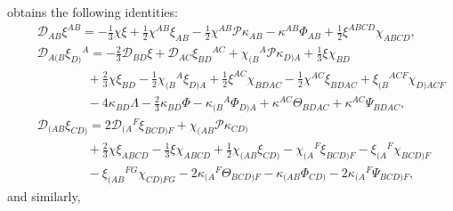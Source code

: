 \documentclass[10pt,a4paper]{article}
\theoremstyle{plain}
\begin{document}
obtains the following identities:
\begin{subequations}
\begin{eqnarray}
&& \mathcal{D}_{AB}\xi^{AB} = -\tfrac{1}{3}\chi\xi+\tfrac{1}{2}
  \chi^{AB} \xi_{AB} -\tfrac{1}{2}\chi^{AB}\mathcal{P} \kappa_{AB}-
  \kappa^{AB} \Phi_{AB} + \tfrac{1}{2} \xi^{ABCD}
  \chi_{ABCD}, \label{SenDivergenceOfSpaceSpinorAuxiliaryVector}\\ &&
  \mathcal{D}_{A(B}\xi_{D)}{}^A =- \tfrac{2}{3}
  \mathcal{D}_{BD}\xi+\mathcal{D}_{AC}\xi_{BD}{}^{AC}+\chi_{(B}{}^A\mathcal{P}\kappa_{D)A}
  + \tfrac{1}{3} \xi \chi_{BD} \nonumber\\ && \qquad \qquad+
  \tfrac{2}{3} \chi \xi_{BD}- \tfrac{1}{2} \chi_{(B}{}^{A}\xi_{D)A}+
  \tfrac{1}{2} \xi^{AC} \chi_{BDAC} - \tfrac{1}{2} \chi^{AC}
  \xi_{BDAC} +\xi_{(B}{}^{ACF}\chi_{D)ACF}\nonumber\\ && \qquad \qquad
  -4 \kappa_{BD} \Lambda - \tfrac{2}{3} \kappa_{BD} \Phi -
  \kappa_{(B}{}^{A}\Phi_{D)A}+ \kappa^{AC} \Theta_{BDAC} + \kappa^{AC}
  \Psi_{BDAC}, \label{SenCurlOfSpaceSpinorAuxiliaryVector}\\ &&
  \mathcal{D}_{(AB}\xi_{CD)}= 2
  \mathcal{D}_{(A}{}^{F}\xi_{BCD)F}+\chi_{(AB}\mathcal{P}\kappa_{CD)}
  \nonumber\\ && \qquad \qquad+\tfrac{2}{3} \chi \xi_{ABCD} -
  \tfrac{1}{3} \xi \chi_{ABCD} + \tfrac{1}{2} \chi_{(AB}\xi_{CD)} -
  \chi_{(A}{}^{F}\xi_{BCD)F} - \xi_{(A}{}^{F}\chi_{BCD)F}
  \nonumber\\ && \qquad \qquad - \xi_{(AB}{}^{FG}\chi_{CD)FG} - 2
  \kappa_{(A}{}^{F}\Theta_{BCD)F} - \kappa_{(AB}\Phi_{CD)} - 2
  \kappa_{(A}{}^{F}\Psi_{BCD)F}, \label{SenGradSymmetrisedOfSpaceSpinorAuxiliaryVector}
\end{eqnarray}
\end{subequations}
and similarly,
\end{document}
